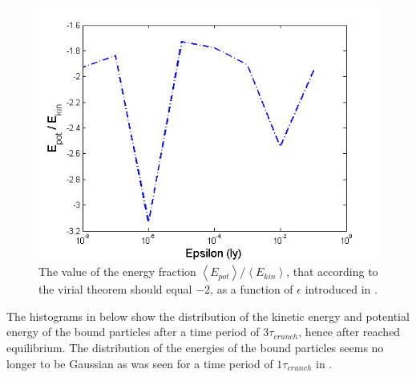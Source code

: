 \begin{figure}[H]
\centering
	\includegraphics[width=0.6\linewidth]{Figures/epsilon_frac.png}
\caption{
The value of the energy fraction $\left< E_{pot} \right>$/$\left< E_{kin} \right>$, that according to the virial theorem should equal $-2$, as a function of $\epsilon$ introduced in .
}
\label{fig:epsilonfrac}
\end{figure}
The histograms in  below show the distribution of the kinetic energy and potential energy of the bound particles after a time period of $3\tau_{crunch}$, hence after reached equilibrium. 
The distribution of the energies of the bound particles seems no longer to be Gaussian as was seen for a time period of $1\tau_{crunch}$ in .
